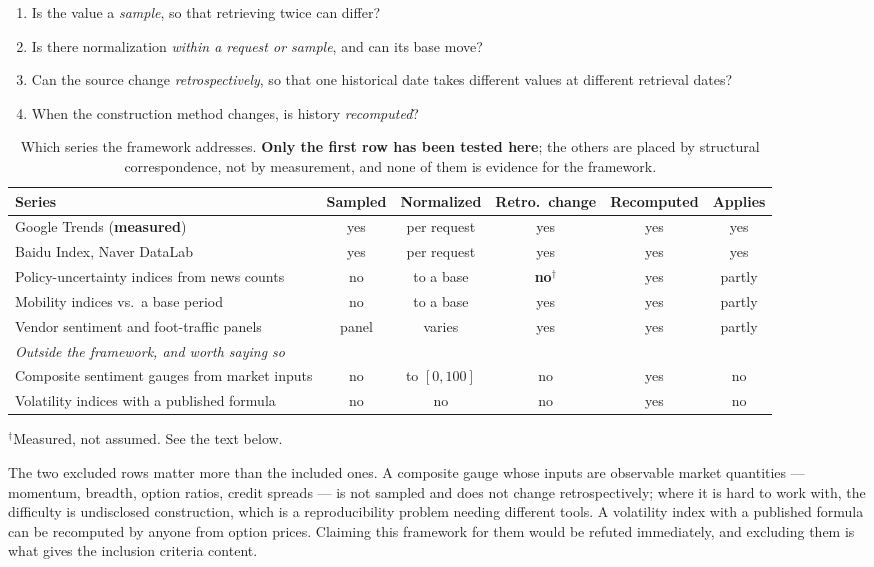 \documentclass[12pt,a4paper,oneside]{article}
\begin{document}
\begin{enumerate}
\item Is the value a \emph{sample}, so that retrieving twice can differ?
\item Is there normalization \emph{within a request or sample}, and can its base
move?
\item Can the source change \emph{retrospectively}, so that one historical date
takes different values at different retrieval dates?
\item When the construction method changes, is history \emph{recomputed}?
\end{enumerate}

\begin{table}[H]
\centering
\small
\caption{Which series the framework addresses. \textbf{Only the first row has been
tested here}; the others are placed by structural correspondence, not by
measurement, and none of them is evidence for the framework.}
\label{tab:appliesto}
\begin{tabularx}{\textwidth}{Xcccc c}
\toprule
Series & Sampled & Normalized & Retro.\ change & Recomputed & Applies\\
\midrule
Google Trends (\textbf{measured}) & yes & per request & yes & yes & yes\\
Baidu Index, Naver DataLab & yes & per request & yes & yes & yes\\
Policy-uncertainty indices from news counts & no & to a base & \textbf{no}$^\dagger$ & yes & partly\\
Mobility indices vs.\ a base period & no & to a base & yes & yes & partly\\
Vendor sentiment and foot-traffic panels & panel & varies & yes & yes & partly\\
\midrule
\multicolumn{6}{l}{\emph{Outside the framework, and worth saying so}}\\
Composite sentiment gauges from market inputs & no & to $[0,100]$ & no & yes & no\\
Volatility indices with a published formula & no & no & no & yes & no\\
\bottomrule
\end{tabularx}
\raggedright\footnotesize
$^\dagger$Measured, not assumed. See the text below.
\end{table}

The two excluded rows matter more than the included ones. A composite gauge whose
inputs are observable market quantities --- momentum, breadth, option ratios,
credit spreads --- is not sampled and does not change retrospectively; where it is
hard to work with, the difficulty is undisclosed construction, which is a
reproducibility problem needing different tools. A volatility index with a
published formula can be recomputed by anyone from option prices. Claiming this
framework for them would be refuted immediately, and excluding them is what gives
the inclusion criteria content.
\end{document}
